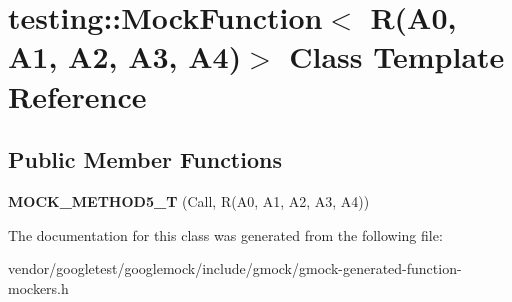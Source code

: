 \hypertarget{classtesting_1_1_mock_function_3_01_r_07_a0_00_01_a1_00_01_a2_00_01_a3_00_01_a4_08_4}{}\section{testing\+:\+:Mock\+Function$<$ R(A0, A1, A2, A3, A4)$>$ Class Template Reference}
\label{classtesting_1_1_mock_function_3_01_r_07_a0_00_01_a1_00_01_a2_00_01_a3_00_01_a4_08_4}
\subsection*{Public Member Functions}
\begin{DoxyCompactItemize}
\item 
\mbox{\label{classtesting_1_1_mock_function_3_01_r_07_a0_00_01_a1_00_01_a2_00_01_a3_00_01_a4_08_4_a572318905fea75f71338c120f7d1833d}} 
{\bfseries M\+O\+C\+K\+\_\+\+M\+E\+T\+H\+O\+D5\+\_\+T} (Call, R(A0, A1, A2, A3, A4))
\end{DoxyCompactItemize}


The documentation for this class was generated from the following file\+:\begin{DoxyCompactItemize}
\item 
vendor/googletest/googlemock/include/gmock/gmock-\/generated-\/function-\/mockers.\+h\end{DoxyCompactItemize}
